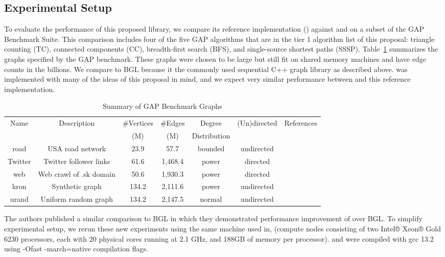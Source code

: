 \subsection{Experimental Setup}
To evaluate the performance of this proposed library, we compare its reference implementation
(\stdgraph) against \bgl and \nwgraph on a subset of the GAP Benchmark Suite\cite{gapbs_2023}.
This comparison includes four of the five GAP algorithms that are in the tier 1 algorithm list of this proposal:
triangle counting (TC), connected components (CC), breadth-first search (BFS),
and single-source shortest paths (SSSP).
Table~\ref{tab:gap_graphs} summarizes the graphs specified by the GAP benchmark.
These graphs were chosen to be large but still fit on shared memory machines and have edge counts in the billions.
We compare to BGL because it the commonly used sequential C++ graph library as described above.
\nwgraph was implemented with many of the ideas of this proposal in mind, and we expect very similar performance
between \nwgraph and this reference implementation.

\begin{table}[h!]
\centering
\begin{tabular}{c c c c c c c}
Name & Description & \#Vertices & \#Edges & Degree & (Un)directed & References \\
     &             & (M)        & (M)     & Distribution & & \\\hline
road & USA road network & 23.9 & 57.7 & bounded & undirected & \cite{dimacs9th}\\\hline
Twitter & Twitter follower links & 61.6 & 1,468.4 & power & directed & \cite{Twitter}\\\hline
web & Web crawl of .sk domain & 50.6 & 1,930.3 & power & directed & \cite{LAW1}\\\hline
kron & Synthetic graph & 134.2 & 2,111.6 & power & undirected & \cite{Graph500} \\\hline
urand & Uniform random graph & 134.2 & 2,147.5 & normal & undirected & \cite{Erdos}\\\hline
\end{tabular}
\caption{Summary of GAP Benchmark Graphs}
\label{tab:gap_graphs}
\end{table}

The \nwgraph authors published a similar comparison to BGL\cite{REF_nwgraph_library} in which they
demonstrated performance improvement of \nwgraph over BGL.
To simplify experimental setup, we rerun these new experiments using the same machine used in\cite{REF_nwgraph_library},
(compute nodes consisting of two Intel® Xeon® Gold 6230 processors, each with 20 physical cores running at 2.1 GHz,
and 188GB of memory per processor).
\nwgraph and \stdgraph were compiled with gcc 13.2 using -Ofast -march=native compilation flags.

